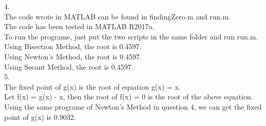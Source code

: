 \documentclass[a4paper]{article}
\begin{document}
4.\\
The code wrote in MATLAB can be found in findingZero.m and run.m.\\
The code has been tested in MATLAB R2017a.\\
To run the programe, just put the two scripts in the same folder and run run.m.\\
Using Bisection Method, the root is 0.4597.\\
Using Newton's Method, the root is 0.4597.\\
Using Secant Method, the root is 0.4597.\\

5.\\
The fixed point of g(x) is the root of equation g(x) = x.\\
Let f(x) = g(x) - x, then the root of f(x) = 0 is the root of the above equation.\\
Using the same programe of Newton's Method in question 4, we can get the fixed point of g(x) is 0.9032.\\
\end{document}
